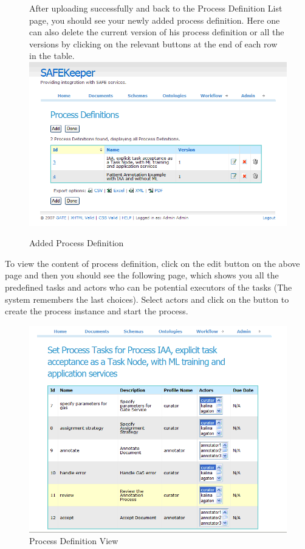 \begin{figure}[htb]
After uploading successfully and back to the Process Definition 
List page, you should see your newly added process definition. Here 
one can also delete the current version of his process definition 
or all the versions by clicking on the relevant buttons at the end 
of each row in the table.
\newline
\newline
\includegraphics[scale=0.4]{processdefinitionuploaded}
\caption{Added Process Definition}
\label{fig:processdefintionuploaded}
\end{figure}


To view the content of process definition, click on the edit button 
on the above page and then you should see the following page, which 
shows you all the predefined tasks and actors who can be potential 
executors of the tasks (The system remembers the last choices). 
Select actors and click on the button to create the process instance 
and start the process.
\begin{figure}[htb]
\includegraphics[scale=0.4]{viewprocessdefinition}
\caption{Process Definition View}
\label{fig:viewprocessdefinition}
\end{figure}


